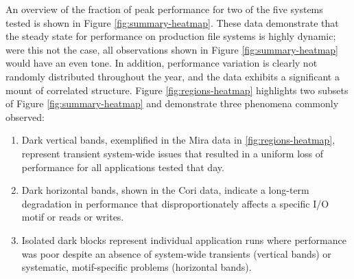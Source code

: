 An overview of the fraction of peak performance for two of the five systems tested is shown in Figure \ref{fig:summary-heatmap}.
These data demonstrate that the steady state for performance on production file systems is highly dynamic; were this not the case, all observations shown in Figure \ref{fig:summary-heatmap} would have an even tone.
In addition, performance variation is clearly not randomly distributed throughout the year, and the data exhibits a significant a mount of correlated structure.
Figure \ref{fig:regions-heatmap} highlights two subsets of Figure \ref{fig:summary-heatmap} and demonstrate three phenomena commonly observed:

\begin{enumerate}[leftmargin=*]
\item Dark vertical bands, exemplified in the Mira data in \ref{fig:regions-heatmap}, represent transient system-wide issues that resulted in a uniform loss of performance for all applications tested that day.
\item Dark horizontal bands, shown in the Cori data, indicate a long-term degradation in performance that disproportionately affects a specific I/O motif or reads or writes.
\item Isolated dark blocks represent individual application runs where performance was poor despite an absence of system-wide transients (vertical bands) or systematic, motif-specific problems (horizontal bands).
\end{enumerate}




